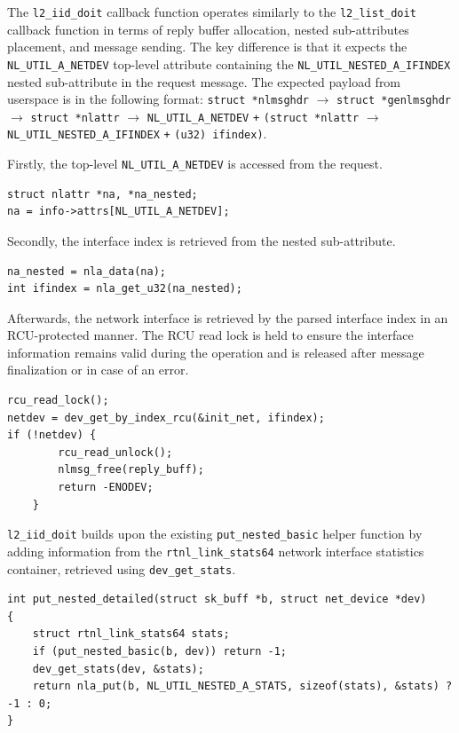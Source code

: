 \documentclass[10pt, letterpaper]{article}
\begin{document}
The \texttt{l2\_iid\_doit} callback function operates similarly to the
\texttt{l2\_list\_doit} callback function in terms of reply buffer allocation, nested
sub-attributes placement, and message sending. The key difference is that it expects the
\texttt{NL\_UTIL\_A\_NETDEV} top-level attribute containing the
\texttt{NL\_UTIL\_NESTED\_A\_IFINDEX} nested sub-attribute in the request message.
The expected payload from userspace is in the following format: \texttt{struct *nlmsghdr}
$\rightarrow$ \texttt{struct *genlmsghdr} $\rightarrow$ \texttt{struct *nlattr}
$\rightarrow$ \texttt{NL\_UTIL\_A\_NETDEV} \texttt{+} \texttt{(struct *nlattr}
$\rightarrow$ \texttt{NL\_UTIL\_NESTED\_A\_IFINDEX} \texttt{+} \texttt{(u32) ifindex)}.

Firstly, the top-level \texttt{NL\_UTIL\_A\_NETDEV} is accessed from the request.
\begin{lstlisting}[caption={Top-level attribute access}]
struct nlattr *na, *na_nested;
na = info->attrs[NL_UTIL_A_NETDEV];
\end{lstlisting}

Secondly, the interface index is retrieved from the nested sub-attribute.
\begin{lstlisting}[caption={Nested sub-attribute access}]
na_nested = nla_data(na);
int ifindex = nla_get_u32(na_nested);
\end{lstlisting}

Afterwards, the network interface is retrieved by the parsed interface index in an
RCU-protected manner. The RCU read lock is held to ensure the interface information remains valid during
the operation and is released after message finalization or in case of an error.
\begin{lstlisting}[caption={Network interface information retrieval}]
rcu_read_lock();
netdev = dev_get_by_index_rcu(&init_net, ifindex);
if (!netdev) {
	    rcu_read_unlock();
	    nlmsg_free(reply_buff);
	    return -ENODEV;
	}
\end{lstlisting}

\texttt{l2\_iid\_doit} builds upon the existing \texttt{put\_nested\_basic} helper
function by adding information from the \texttt{rtnl\_link\_stats64} network interface
statistics container, retrieved using \texttt{dev\_get\_stats}.

\begin{lstlisting}[caption={Network interface statistics retrieval}]
int put_nested_detailed(struct sk_buff *b, struct net_device *dev)
{
    struct rtnl_link_stats64 stats;
    if (put_nested_basic(b, dev)) return -1;
    dev_get_stats(dev, &stats);
    return nla_put(b, NL_UTIL_NESTED_A_STATS, sizeof(stats), &stats) ? -1 : 0;
}
\end{lstlisting}
\end{document}
